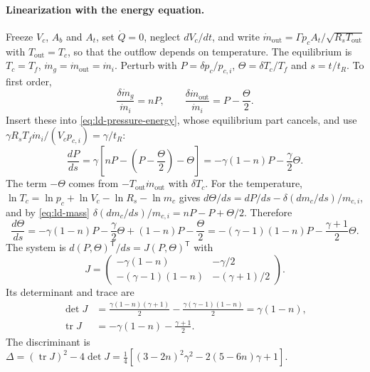 \paragraph{Linearization with the energy equation.} Freeze $V_c$,
$A_b$ and $A_t$, set $\dot Q=0$, neglect $dV_c/dt$, and write
$\dot m_{\mathrm{out}}=\Gamma p_cA_t/\sqrt{R_sT_{\mathrm{out}}}$ with
$T_{\mathrm{out}}=T_c$, so that the outflow depends on temperature. The equilibrium is $T_c=T_f$,
$\dot m_g=\dot m_{\mathrm{out}}=\dot m_i$. Perturb with
$P=\delta p_c/p_{c,i}$, $\Theta=\delta T_c/T_f$ and $s=t/t_R$.
To first order,
\[
 \frac{\delta\dot m_g}{\dot m_i}=nP,\qquad
 \frac{\delta\dot m_{\mathrm{out}}}{\dot m_i}=P-\frac{\Theta}{2}.
\]
Insert these into \eqref{eq:ld-pressure-energy}, whose equilibrium
part cancels, and use $\gamma R_sT_f\dot m_i/(V_cp_{c,i})=\gamma/t_R$:
\[
 \frac{dP}{ds}
 =\gamma\left[nP-\left(P-\frac\Theta2\right)-\Theta\right]
 =-\gamma(1-n)P-\frac{\gamma}{2}\Theta .
\]
The term $-\Theta$ comes from $-T_{\mathrm{out}}\dot m_{\mathrm{out}}$ with
$\delta T_c$. For the temperature, $\ln T_c=\ln p_c+\ln V_c-\ln R_s-\ln m_c$
gives $d\Theta/ds=dP/ds-\delta(dm_c/ds)/m_{c,i}$, and by
\eqref{eq:ld-mass}
$\delta(dm_c/ds)/m_{c,i}=nP-P+\Theta/2$. Therefore
\[
 \frac{d\Theta}{ds}
 =-\gamma(1-n)P-\frac\gamma2\Theta+(1-n)P-\frac\Theta2
 =-(\gamma-1)(1-n)P-\frac{\gamma+1}{2}\Theta .
\]
The system is $d(P,\Theta)^{\mathsf T}/ds=J(P,\Theta)^{\mathsf T}$ with
\[
 J=\begin{pmatrix}
 -\gamma(1-n) & -\gamma/2\\
 -(\gamma-1)(1-n) & -(\gamma+1)/2
 \end{pmatrix}.
\]
Its determinant and trace are
\begin{align*}
 \det J&=\frac{\gamma(1-n)(\gamma+1)}{2}-\frac{\gamma(\gamma-1)(1-n)}{2}
        =\gamma(1-n),\\
 \operatorname{tr}J&=-\gamma(1-n)-\frac{\gamma+1}{2}.
\end{align*}
The discriminant is
$\Delta=(\operatorname{tr}J)^2-4\det J
=\tfrac14\left[(3-2n)^2\gamma^2-2(5-6n)\gamma+1\right]$.

